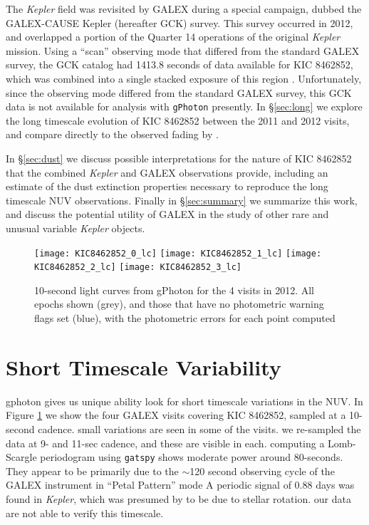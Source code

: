 \documentclass[twocolumn]{aastex6}
\newcommand{\Kepler}{\textsl{Kepler}\xspace}
\begin{document}
The \Kepler field was revisited by GALEX during a special campaign, dubbed the GALEX-CAUSE Kepler (hereafter GCK) survey. This survey occurred in 2012, and overlapped a portion of the Quarter 14 operations of the original \Kepler mission. Using a ``scan'' observing mode that differed from the standard GALEX survey, the GCK catalog had 1413.8 seconds of data available for KIC 8462852, which was combined into a single stacked exposure of this region \citep{olmedo2015}. Unfortunately, since the observing mode differed from the standard GALEX survey, this GCK data is not available for analysis with {\tt gPhoton} presently. In \S\ref{sec:long} we explore the long timescale evolution of KIC 8462852 between the 2011 and 2012 visits, and compare directly to the observed fading by \citet{montet2016}.

In \S\ref{sec:dust} we discuss possible interpretations for the nature of KIC 8462852 that the combined \Kepler and GALEX observations provide, including an estimate of the dust extinction properties necessary to reproduce the long timescale NUV observations. Finally in \S\ref{sec:summary} we summarize this work, and discuss the potential utility of GALEX in the study of other rare and unusual variable \Kepler objects.


\begin{figure}[!t]
\centering
\texttt{[image: KIC8462852\_0\_lc]}
\texttt{[image: KIC8462852\_1\_lc]}
\texttt{[image: KIC8462852\_2\_lc]}
\texttt{[image: KIC8462852\_3\_lc]}
\caption{
10-second light curves from gPhoton for the 4 visits in 2012. All epochs shown (grey), and those that have no photometric warning flags set (blue), with the photometric errors for each point computed}
\label{fig:shorttime}
\end{figure}



\section{Short Timescale Variability}
\label{sec:short}

gphoton gives us unique ability look for short timescale variations in the NUV.  In Figure \ref{fig:shorttime} we show the four GALEX visits covering KIC 8462852, sampled at a 10-second cadence. small variations are seen in some of the visits. we re-sampled the data at 9- and 11-sec cadence, and these are visible in each. computing a Lomb-Scargle periodogram using {\tt gatspy} \citep{gatspy} shows moderate power around 80-seconds. They appear to be primarily due to the $\sim$120 second observing cycle of the GALEX instrument in ``Petal Pattern'' mode 
A periodic signal of 0.88 days was found in \Kepler, which was presumed by \citet{boyajian2015} to be due to stellar rotation. our data are not able to verify this timescale.
\end{document}
